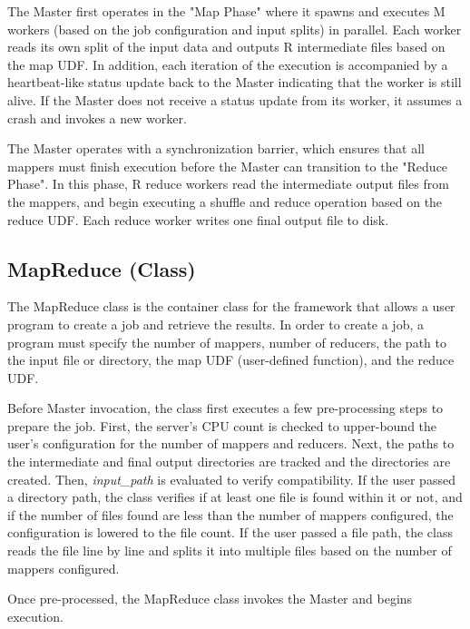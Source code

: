 \documentclass[a4paper,12pt]{article}
\begin{document}
The Master first operates in the "Map Phase" where it spawns and executes M workers (based on the job configuration and input splits) in parallel. Each worker reads its own split of the input data and outputs R intermediate files based on the map UDF. In addition, each iteration of the execution is accompanied by a heartbeat-like status update back to the Master indicating that the worker is still alive. If the Master does not receive a status update from its worker, it assumes a crash and invokes a new worker. \newline

The Master operates with a synchronization barrier, which ensures that all mappers must finish execution before the Master can transition to the "Reduce Phase". In this phase, R reduce workers read the intermediate output files from the mappers, and begin executing a shuffle and reduce operation based on the reduce UDF. Each reduce worker writes one final output file to disk.

\subsection{MapReduce (Class)}
The MapReduce class is the container class for the framework that allows a user program to create a job and retrieve the results. In order to create a job, a program must specify the number of mappers, number of reducers, the path to the input file or directory, the map UDF (user-defined function), and the reduce UDF. \newline

Before Master invocation, the class first executes a few pre-processing steps to prepare the job. First, the server's CPU count is checked to upper-bound the user's configuration for the number of mappers and reducers. Next, the paths to the intermediate and final output directories are tracked and the directories are created. Then, \textit{input\_path} is evaluated to verify compatibility. If the user passed a directory path, the class verifies if at least one file is found within it or not, and if the number of files found are less than the number of mappers configured, the configuration is lowered to the file count. If the user passed a file path, the class reads the file line by line and splits it into multiple files based on the number of mappers configured. \newline

Once pre-processed, the MapReduce class invokes the Master and begins execution.
\end{document}
